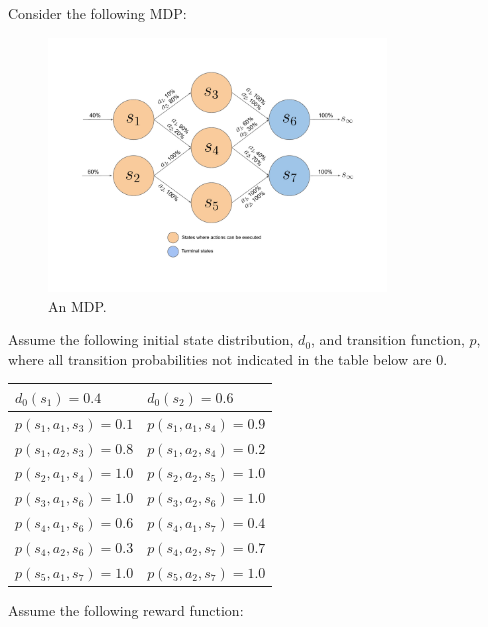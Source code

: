 \documentclass{article}
\begin{document}
Consider the following MDP:
\begin{figure}[h!!!]
    \centering
    \includegraphics[width=0.8\textwidth]{HW_figs/HW1_MDP.pdf}
    \caption{An MDP.}
\end{figure}

\noindent Assume the following initial state distribution, $d_0$, and transition function, $p$, where all transition probabilities not indicated in the table below are $0$.

\begin{table}[h!!!]
\centering
\begin{tabular}{|l|l|}
\hline
$d_0(s_1)=0.4$ & $d_0(s_2)=0.6$ \\ \hline
$p(s_1,a_1,s_3)=0.1$    &   $p(s_1,a_1,s_4)=0.9$ \\ \hline
$p(s_1,a_2,s_3)=0.8$    &   $p(s_1,a_2,s_4)=0.2$ \\ \hline
$p(s_2,a_1,s_4)=1.0$    &   $p(s_2,a_2,s_5)=1.0$ \\ \hline
$p(s_3,a_1,s_6)=1.0$    &   $p(s_3,a_2,s_6)=1.0$ \\ \hline
$p(s_4,a_1,s_6)=0.6$    &   $p(s_4,a_1,s_7)=0.4$ \\ \hline
$p(s_4,a_2,s_6)=0.3$    &   $p(s_4,a_2,s_7)=0.7$ \\ \hline
$p(s_5,a_1,s_7)=1.0$    &   $p(s_5,a_2,s_7)=1.0$ \\ \hline
\end{tabular}
\end{table}

\noindent Assume the following reward function:
\end{document}
